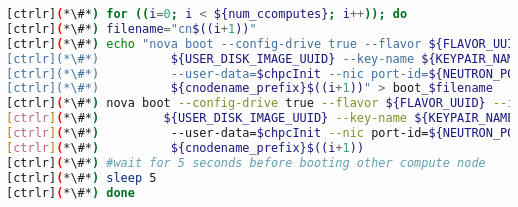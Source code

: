 \begin{lstlisting}[language=bash,keywords={}]
[ctrlr](*\#*) for ((i=0; i < ${num_ccomputes}; i++)); do
[ctrlr](*\#*) filename="cn$((i+1))"
[ctrlr](*\#*) echo "nova boot --config-drive true --flavor ${FLAVOR_UUID} --image \
[ctrlr](*\#*)          ${USER_DISK_IMAGE_UUID} --key-name ${KEYPAIR_NAME} --meta role=webservers \
[ctrlr](*\#*)          --user-data=$chpcInit --nic port-id=${NEUTRON_PORT_ID_CC[$i]} \
[ctrlr](*\#*)          ${cnodename_prefix}$((i+1))" > boot_$filename
[ctrlr](*\#*) nova boot --config-drive true --flavor ${FLAVOR_UUID} --image \
[ctrlr](*\#*)         ${USER_DISK_IMAGE_UUID} --key-name ${KEYPAIR_NAME} --meta role=webservers \
[ctrlr](*\#*)          --user-data=$chpcInit --nic port-id=${NEUTRON_PORT_ID_CC[$i]} \
[ctrlr](*\#*)          ${cnodename_prefix}$((i+1))
[ctrlr](*\#*) #wait for 5 seconds before booting other compute node
[ctrlr](*\#*) sleep 5
[ctrlr](*\#*) done
\end{lstlisting}

